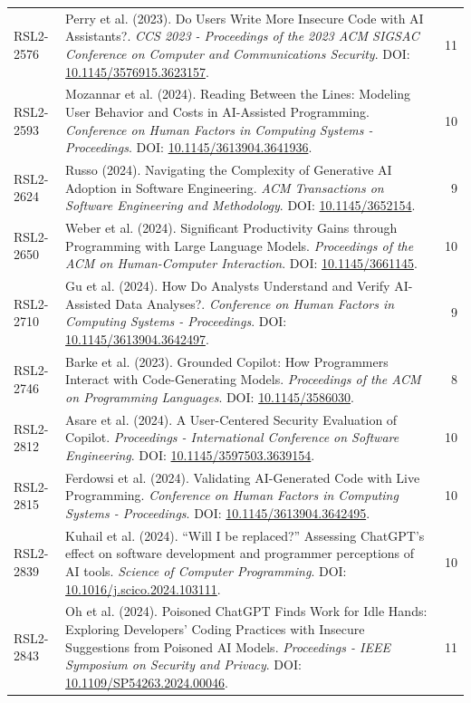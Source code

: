 \begin{small}
\begin{longtable}{lp{11.2cm}r}
RSL2-2576 & Perry et al. (2023). Do Users Write More Insecure Code with AI Assistants?. \textit{CCS 2023 - Proceedings of the 2023 ACM SIGSAC Conference on Computer and Communications Security}. DOI: \url{10.1145/3576915.3623157}. & 11 \\
RSL2-2593 & Mozannar et al. (2024). Reading Between the Lines: Modeling User Behavior and Costs in AI-Assisted Programming. \textit{Conference on Human Factors in Computing Systems - Proceedings}. DOI: \url{10.1145/3613904.3641936}. & 10 \\
RSL2-2624 & Russo (2024). Navigating the Complexity of Generative AI Adoption in Software Engineering. \textit{ACM Transactions on Software Engineering and Methodology}. DOI: \url{10.1145/3652154}. & 9 \\
RSL2-2650 & Weber et al. (2024). Significant Productivity Gains through Programming with Large Language Models. \textit{Proceedings of the ACM on Human-Computer Interaction}. DOI: \url{10.1145/3661145}. & 10 \\
RSL2-2710 & Gu et al. (2024). How Do Analysts Understand and Verify AI-Assisted Data Analyses?. \textit{Conference on Human Factors in Computing Systems - Proceedings}. DOI: \url{10.1145/3613904.3642497}. & 9 \\
RSL2-2746 & Barke et al. (2023). Grounded Copilot: How Programmers Interact with Code-Generating Models. \textit{Proceedings of the ACM on Programming Languages}. DOI: \url{10.1145/3586030}. & 8 \\
RSL2-2812 & Asare et al. (2024). A User-Centered Security Evaluation of Copilot. \textit{Proceedings - International Conference on Software Engineering}. DOI: \url{10.1145/3597503.3639154}. & 10 \\
RSL2-2815 & Ferdowsi et al. (2024). Validating AI-Generated Code with Live Programming. \textit{Conference on Human Factors in Computing Systems - Proceedings}. DOI: \url{10.1145/3613904.3642495}. & 10 \\
RSL2-2839 & Kuhail et al. (2024). “Will I be replaced?” Assessing ChatGPT's effect on software development and programmer perceptions of AI tools. \textit{Science of Computer Programming}. DOI: \url{10.1016/j.scico.2024.103111}. & 10 \\
RSL2-2843 & Oh et al. (2024). Poisoned ChatGPT Finds Work for Idle Hands: Exploring Developers' Coding Practices with Insecure Suggestions from Poisoned AI Models. \textit{Proceedings - IEEE Symposium on Security and Privacy}. DOI: \url{10.1109/SP54263.2024.00046}. & 11 \\

\end{longtable}
\end{small}
